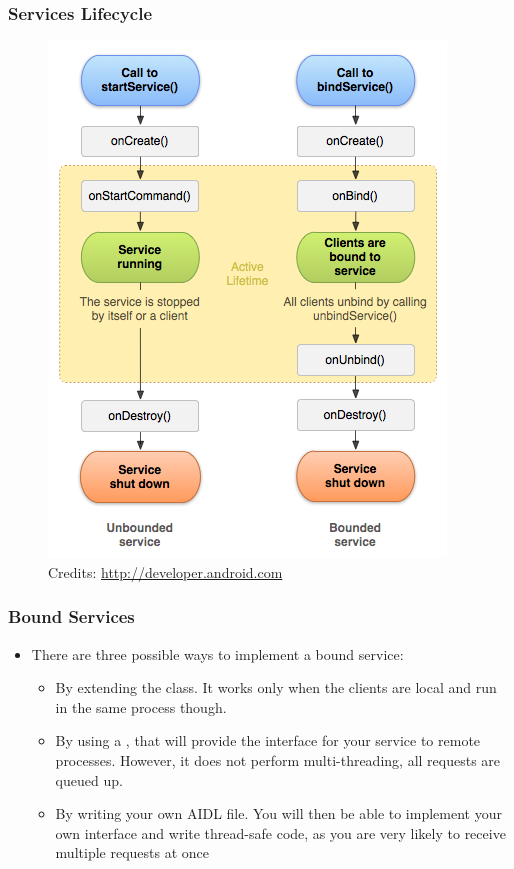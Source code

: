\begin{frame}
  \frametitle{Services Lifecycle}
  \begin{figure}[h!]
    \centering
    \includegraphics[height=0.8\textheight]{slides/android-application-services/service-lifecycle.png}\\
    {
      \tiny
      Credits: \url{http://developer.android.com}
    }
  \end{figure}
\end{frame}

\begin{frame}
  \frametitle{Bound Services}
  \begin{itemize}
  \item There are three possible ways to implement a bound service:
    \begin{itemize}
    \item By extending the  class. It works only when the
      clients are local and run in the same process though.
    \item By using a , that will provide the interface
      for your service to remote processes. However, it does not
      perform multi-threading, all requests are queued up.
    \item By writing your own AIDL file. You will then be able to
      implement your own interface and write thread-safe code, as you
      are very likely to receive multiple requests at once
    \end{itemize}
  \end{itemize}
\end{frame}

